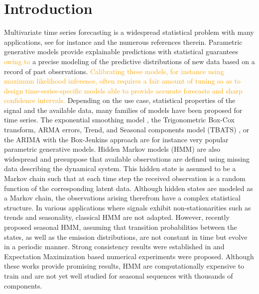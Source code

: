 \documentclass[10pt]{article} %
\begin{document}
\section{Introduction}
\label{sec:introduction}
Multivariate time series forecasting is a widespread statistical problem with  many applications, see for instance \citet{sarkka2013, douc2014, zucchini2017} and the numerous references therein.
Parametric generative models provide explainable predictions with statistical guarantees \textcolor{orange}{owing to} a precise modeling of the predictive distributions of new data based on a record of past observations. \textcolor{orange}{Calibrating these models, for instance using maximum likelihood inference, often requires a fair amount of tuning so as to design time-series-specific models able to provide  accurate forecasts and sharp confidence intervals.} Depending on the use case, statistical properties of the signal and the available data, many families of models have been proposed for time series.  The exponential smoothing model \citep{Brown1961}, the Trigonometric Box-Cox transform, ARMA errors, Trend, and Seasonal components model (TBATS) \citep{alysha2011}, or the ARIMA with the Box-Jenkins approach \citep{box2015} are for instance very popular parametric generative models.  Hidden Markov models (HMM) are also widespread and presuppose that available observations are defined using missing data describing the dynamical system. This hidden state is assumed to be a Markov chain such that at each time step the received observation is a random function of the corresponding latent data.  Although hidden states are modeled as a Markov chain, the observations arising therefrom have a complex statistical structure.
In various applications where signals exhibit non-stationarities such as trends and seasonality, classical HMM are not adapted. However, \citet{touron2017}  recently proposed seasonal HMM, assuming that transition probabilities between the states, as well as the emission distributions, are not constant in time but evolve in a periodic manner. Strong consistency results were established in \citet{touron2019} and Expectation Maximization based numerical experiments were proposed.
Although these works provide promising results, HMM are computationally expensive to train and are not yet well studied for seasonal  sequences with thousands of components.
 
\end{document}
